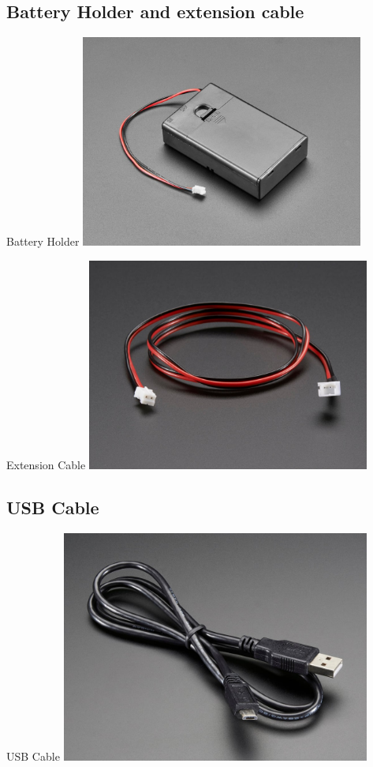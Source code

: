 \documentclass[aspectratio=169]{beamer}
\begin{document}
\subsection{Battery Holder and extension cable}
\begin{frame}[fragile]{Battery Holder}
\includegraphics[height=2.75in]{BatteryHolder.jpg}
\end{frame}
\begin{frame}[fragile]{Extension Cable}
\includegraphics[height=2.75in]{ExtenssionCable.jpg}
\end{frame}
\subsection{USB Cable}
\begin{frame}[fragile]{USB Cable}
\includegraphics[width=4in]{USBCable.jpg}
\end{frame}
\end{document}
